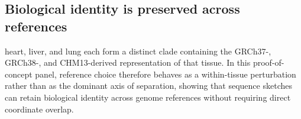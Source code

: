 \documentclass[11pt]{article}
\begin{document}
\subsection{Biological identity is preserved across references}

heart, liver, and lung each form a distinct clade containing the GRCh37-, GRCh38-, and CHM13-derived representation of that tissue. In this proof-of-concept panel, reference choice therefore behaves as a within-tissue perturbation rather than as the dominant axis of separation, showing that sequence sketches can retain biological identity across genome references without requiring direct coordinate overlap.
\end{document}
